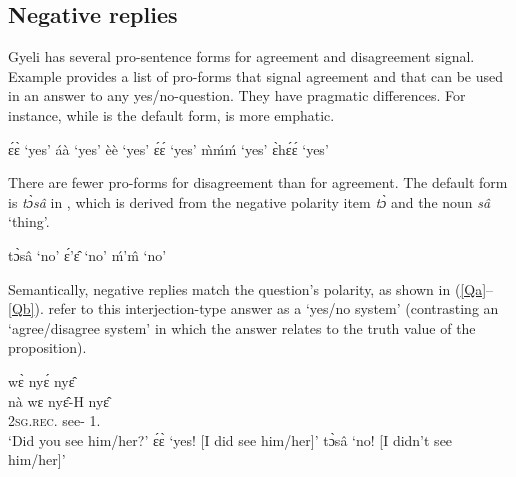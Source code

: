 \documentclass[output=paper,colorlinks=true, citecolor=brown,draftmode]{langscibook}
\begin{document}
\subsection{Negative replies}
\label{sec:gye:NR}

Gyeli has several pro-sentence forms for agreement and disagreement signal. Example  provides a list of pro-forms that signal agreement and that can be used in an answer to any yes/no-question. They have pragmatic differences. For instance, while  is the default form,  is more emphatic. 

\begin{exe} 
\ex\label{yes}
    \begin{xlist}
    \ex\label{yes1} ɛ́ɛ̀ `yes'
    \ex\label{yes2} áà `yes' 
    \ex\label{yes3} èè `yes' 
    \ex\label{yes4} ɛ́ɛ́ `yes' 
    \ex\label{yes5} m̀ḿḿ `yes'
    \ex\label{yes6} ɛ̀hɛ́ɛ́  `yes'
    \end{xlist}
\end{exe}

There are fewer pro-forms for disagreement than for agreement. The default form is {\itshape tɔ̀sâ} in , which is derived from the negative polarity item {\itshape tɔ̀} and the noun {\itshape sâ} `thing'.

\begin{exe}
\ex\label{no}
    \begin{xlist}
    \ex\label{no1} tɔ̀sâ `no'
    \ex\label{no2} ɛ́'ɛ̂ `no'
    \ex\label{no3} ḿ'm̂ `no'
    \end{xlist}
\end{exe}

Semantically, negative replies match the question's polarity, as shown in (\ref{Qa}--\ref{Qb}).  \citet{EnfieldEtAl2019} refer to this interjection-type  answer as a `yes/no system' (contrasting an `agree/disagree system' in which the answer relates to the truth value of the proposition).

\ea\label{Qa}
    \begin{xlist}[A2: ]
         wɛ̀ nyɛ́ nyɛ̂ \\
              nà wɛ nyɛ̂-H nyɛ̂ \\
              {\Q}   2\textsc{sg}.{\textsc{rec.}\PST} see-{\R} 1.{\OBJ}\\
        \trans `Did you see him/her?'
    \label{yesx}  ɛ́ɛ̀ `yes! [I did see him/her]'
    \label{nox} tɔ̀sâ `no! [I didn't see him/her]'
    \end{xlist}
\z 
\end{document}
